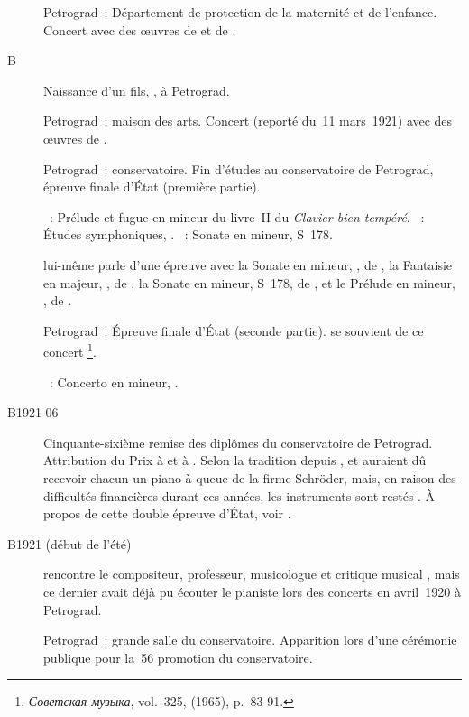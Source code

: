 \begin{description}
 \item[]
 Petrograd~: Département de protection de la maternité et de l'enfance.
 Concert avec des œuvres de \Liszt{} et de \Schumann{}.
 \item[B]
 Naissance d'un fils, \ASofronitsky{}, à Petrograd.
 \item[]
 Petrograd~: maison des arts.
 Concert (reporté du~11 mars~1921) avec des œuvres de \Schumann{}.
 \item[]
 Petrograd~: conservatoire.
 Fin d'études au conservatoire de Petrograd, épreuve finale d'\hbox{État}
 (première partie).

 \textsc{\JBach{}}~: Prélude et fugue en \kB \Flat mineur du livre~II du
 \emph{Clavier bien tempéré}.
 \textsc{\Schumann{}}~: Études symphoniques, .
 \textsc{\Liszt{}}~: Sonate en \kB mineur, S~178.

 \VSofronitsky{} lui-même parle d'une épreuve avec la Sonate en \kC mineur,
 , de \Beethoven{}, la Fantaisie en \kC majeur, , de
 \Schumann{}, la Sonate en \kB mineur, S~178, de \Liszt{}, et le Prélude en
 \kD mineur,  , de \Chopin{} \citep[voir][]{Vitsinsky}.
 \item[]
 Petrograd~: Épreuve finale d'\hbox{État} (seconde partie).
 \citet[p.~88]{Bogdanov65} se souvient de ce concert%
 \footnote{\foreignlanguage{russian}{\emph{Советская музыка}}, vol.~325,
  (1965), p.~83-91.}.

 \textsc{\Scriabine{}}~: Concerto en \kF \Sharp mineur, .
 \item[B1921-06]
 Cinquante-sixième remise des diplômes du conservatoire de Petrograd.
 Attribution du Prix \ARubinstein{} à \MYudina{} et à \VSofronitsky{}.
 Selon la tradition depuis \Rubinstein{}, \Yudina{} et \Sofronitsky{}
 auraient dû recevoir chacun un piano à queue de la firme Schröder, mais, en
 raison des difficultés financières durant ces années, les instruments sont
 restés .
 À propos de cette double épreuve d'\hbox{État}, voir \citet{Strelnikov}.
 \item[B1921 (début de l'été)]
 \VSofronitsky{} rencontre le compositeur, professeur, musicologue et
 critique musical \VBogdanovBerezovsky{} \citep[voir][]{Bogdanov67a}, mais
 ce dernier avait déjà pu écouter le pianiste lors des concerts \Scriabine{}
 en avril~1920 à Petrograd.
 \item[]
 Petrograd~: grande salle du conservatoire.
 Apparition lors d'une cérémonie publique pour la~56\ieme{} promotion du
 conservatoire.


\end{description}

